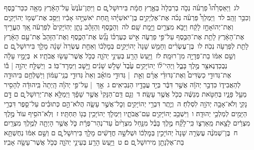 \documentclass[18pt]{article}
\newcommand{\kri}[1]{\Afootnote{#1}}	%
\begin{document}
 {\loc לג~}וַיַּאַסְרֵ֩הוּ֩ פַרְעֹ֨ה נְכֹ֤ה בְרִבְלָה֙ בְּאֶ֣רֶץ חֲמָ֔ת  \edtext{(במלך)}{\kri{קרי: מִמְּלֹ֖ךְ}}  בִּירוּשָׁל ָ֑͏ְם ם וַיִּתֶּן־עֹ֙נֶשׁ֙ עַל־הָאָ֔רֶץ מֵאָ֥ה כִכַּר־כֶּ֖סֶף וְכִכַּ֥ר זָהָֽב׃ \startlock
 {\loc לד~}וַיַּמְלֵךְ֩ פַּרְעֹ֨ה נְכֹ֜ה אֶת־אֶלְיָקִ֣ים בֶּן־יֹאשִׁיָּ֗הוּ תַּ֚חַת יֹאשִׁיָּ֣הוּ אָבִ֔יו וַיַּסֵּ֥ב אֶת־שְׁמ֖וֹ יְהוֹיָקִ֑ים וְאֶת־יְהוֹאָחָ֣ז לָקַ֔ח וַיָּבֹ֥א מִצְרַ֖יִם וַיָּ֥מׇת שָֽׁם׃ \startlock
 {\loc לה~}וְהַכֶּ֣סֶף וְהַזָּהָ֗ב נָתַ֤ן יְהֽוֹיָקִים֙ לְפַרְעֹ֔ה אַ֚ךְ הֶעֱרִ֣יךְ אֶת־הָאָ֔רֶץ לָתֵ֥ת אֶת־הַכֶּ֖סֶף עַל־פִּ֣י פַרְעֹ֑ה אִ֣ישׁ כְּעֶרְכּ֗וֹ נָגַ֞שׂ אֶת־הַכֶּ֤סֶף וְאֶת־הַזָּהָב֙ אֶת־עַ֣ם הָאָ֔רֶץ לָתֵ֖ת לְפַרְעֹ֥ה נְכֹֽה׃ \startlock
 {\loc לו~}בֶּן־עֶשְׂרִ֨ים וְחָמֵ֤שׁ שָׁנָה֙ יְהוֹיָקִ֣ים בְּמׇלְכ֔וֹ וְאַחַ֤ת עֶשְׂרֵה֙ שָׁנָ֔ה מָלַ֖ךְ בִּירוּשָׁל ָ֑͏ְם ם וְשֵׁ֣ם אִמּ֔וֹ  \edtext{(זבידה)}{\kri{קרי: זְבוּדָּ֥ה}}  בַת־פְּדָיָ֖ה מִן־רוּמָֽה׃ \startlock
 {\loc לז~}וַיַּ֥עַשׂ הָרַ֖ע בְּעֵינֵ֣י יְהֹוָ֑ה כְּכֹ֥ל אֲשֶׁר־עָשׂ֖וּ אֲבֹתָֽיו׃ 
\startlock
 {\loc א~}בְּיָמָ֣יו עָלָ֔ה נְבֻכַדְנֶאצַּ֖ר מֶ֣לֶךְ בָּבֶ֑ל וַיְהִי־ל֨וֹ יְהוֹיָקִ֥ים עֶ֙בֶד֙ שָׁלֹ֣שׁ שָׁנִ֔ים וַיָּ֖שׇׁב וַיִּמְרׇד־בּֽוֹ׃ \startlock
 {\loc ב~}וַיְשַׁלַּ֣ח יְהֹוָ֣ה  |  בּ֡וֹ אֶת־גְּדוּדֵ֣י כַשְׂדִּים֩ וְאֶת־גְּדוּדֵ֨י אֲרָ֜ם וְאֵ֣ת  |  גְּדוּדֵ֣י מוֹאָ֗ב וְאֵת֙ גְּדוּדֵ֣י בְנֵֽי־עַמּ֔וֹן וַיְשַׁלְּחֵ֥ם בִּיהוּדָ֖ה לְהַאֲבִיד֑וֹ כִּדְבַ֣ר יְהֹוָ֔ה אֲשֶׁ֣ר דִּבֶּ֔ר בְּיַ֖ד עֲבָדָ֥יו הַנְּבִיאִֽים׃ \startlock
 {\loc ג~}אַ֣ךְ  |  עַל־פִּ֣י יְהֹוָ֗ה הָֽיְתָה֙ בִּֽיהוּדָ֔ה לְהָסִ֖יר מֵעַ֣ל פָּנָ֑יו בְּחַטֹּ֣את מְנַשֶּׁ֔ה כְּכֹ֖ל אֲשֶׁ֥ר עָשָֽׂה׃ \startlock
 {\loc ד~}וְגַ֤ם דַּֽם־הַנָּקִי֙ אֲשֶׁ֣ר שָׁפָ֔ךְ וַיְמַלֵּ֥א אֶת־יְרֽוּשָׁל ַ֖͏ְם ם דָּ֣ם נָקִ֑י וְלֹא־אָבָ֥ה יְהֹוָ֖ה לִסְלֹֽחַ׃ \startlock
 {\loc ה~}וְיֶ֛תֶר דִּבְרֵ֥י יְהוֹיָקִ֖ים וְכׇל־אֲשֶׁ֣ר עָשָׂ֑ה הֲלֹא־הֵ֣ם כְּתוּבִ֗ים עַל־סֵ֛פֶר דִּבְרֵ֥י הַיָּמִ֖ים לְמַלְכֵ֥י יְהוּדָֽה׃ \startlock
 {\loc ו~}וַיִּשְׁכַּ֥ב יְהוֹיָקִ֖ים עִם־אֲבֹתָ֑יו וַיִּמְלֹ֛ךְ יְהוֹיָכִ֥ין בְּנ֖וֹ תַּחְתָּֽיו׃ \startlock
 {\loc ז~}וְלֹֽא־הֹסִ֥יף עוֹד֙ מֶ֣לֶךְ מִצְרַ֔יִם לָצֵ֖את מֵֽאַרְצ֑וֹ כִּֽי־לָקַ֞ח מֶ֣לֶךְ בָּבֶ֗ל מִנַּ֤חַל מִצְרַ֙יִם֙ עַד־נְהַר־פְּרָ֔ת כֹּ֛ל אֲשֶׁ֥ר הָיְתָ֖ה לְמֶ֥לֶךְ מִצְרָֽיִם׃ \startlock
 {\loc ח~}בֶּן־שְׁמֹנֶ֨ה עֶשְׂרֵ֤ה שָׁנָה֙ יְהוֹיָכִ֣ין בְּמׇלְכ֔וֹ וּשְׁלֹשָׁ֣ה חֳדָשִׁ֔ים מָלַ֖ךְ בִּירֽוּשָׁל ָ֑͏ְם ם וְשֵׁ֣ם אִמּ֔וֹ נְחֻשְׁתָּ֥א בַת־אֶלְנָתָ֖ן מִירוּשָׁל ָֽ͏ְם ם׃ \startlock
 {\loc ט~}וַיַּ֥עַשׂ הָרַ֖ע בְּעֵינֵ֣י יְהֹוָ֑ה כְּכֹ֥ל אֲשֶׁר־עָשָׂ֖ה אָבִֽיו׃ \startlock
\end{document}

